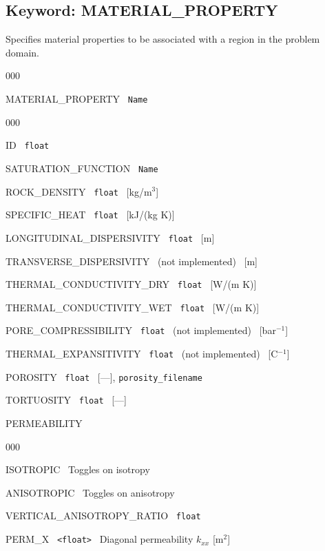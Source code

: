 \documentclass[12pt]{article}
\begin{document}



\newpage
\protect\hypertarget{target_mat}{}

\subsection{Keyword: MATERIAL\_PROPERTY}

 Specifies material properties to be associated with a region in the problem domain.

\begin{deflist}{000}
\item[MATERIAL\_PROPERTY] \ {\tt Name}
\begin{deflist}{000}
\item[ID] \ {\tt float}
\item[SATURATION\_FUNCTION] \ {\tt Name}
\item[ROCK\_DENSITY] \ {\tt float} \ [kg/m$^3$]
\item[SPECIFIC\_HEAT] \ {\tt float} \ [kJ/(kg K)]
\item[LONGITUDINAL\_DISPERSIVITY] \ {\tt float} \ [m]
\item[TRANSVERSE\_DISPERSIVITY] \ (not implemented) \ [m]
\item[THERMAL\_CONDUCTIVITY\_DRY] \ {\tt float} \ [W/(m K)]
\item[THERMAL\_CONDUCTIVITY\_WET] \ {\tt float} \ [W/(m K)]
\item[PORE\_COMPRESSIBILITY] \ {\tt float} \ (not implemented) \ [bar$^{-1}$]
\item[THERMAL\_EXPANSITIVITY] \ {\tt float} \ (not implemented) \ [C$^{-1}$]
\item[POROSITY] \ {\tt float} \ [---], {\tt porosity\_filename}
\item[TORTUOSITY] \ {\tt float} \ [---]
\item[PERMEABILITY] ~
\begin{deflist}{000}
\item[ISOTROPIC] \ Toggles on isotropy
\item[ANISOTROPIC] \ Toggles on anisotropy
\item[VERTICAL\_ANISOTROPY\_RATIO] \ {\tt float}
\item[PERM\_X] \ {\tt <float>} \ Diagonal permeability $k_{xx}$ [m$^2$]

\end{deflist}
\end{deflist}
\end{deflist}
\end{document}
